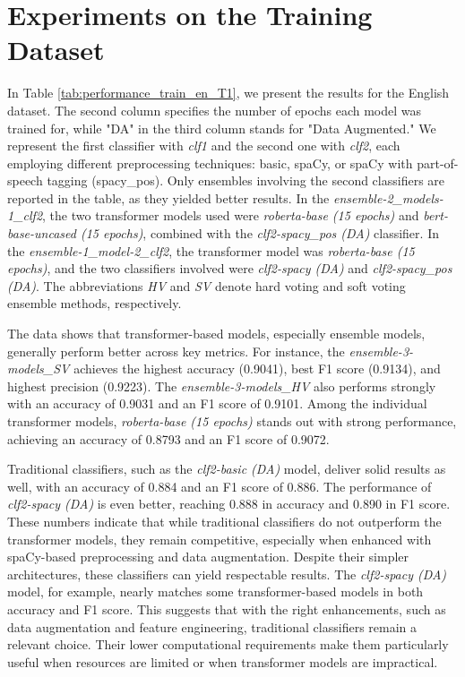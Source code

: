 \documentclass{Configuration_Files/PoliMi3i_thesis}
\begin{document}
\section{Experiments on the Training Dataset} \label{sec:experiments_train_dataset}
In Table \ref{tab:performance_train_en_T1}, we present the results for the English dataset. The second column specifies the number of epochs each model was trained for, while "DA" in the third column stands for "Data Augmented." We represent the first classifier with \textit{clf1} and the second one with \textit{clf2}, each employing different preprocessing techniques: basic, spaCy, or spaCy with part-of-speech tagging (spacy\_pos). Only ensembles involving the second classifiers are reported in the table, as they yielded better results. In the \textit{ensemble-2\_models-1\_clf2}, the two transformer models used were \textit{roberta-base (15 epochs)} and \textit{bert-base-uncased (15 epochs)}, combined with the \textit{clf2-spacy\_pos (DA)} classifier. In the \textit{ensemble-1\_model-2\_clf2}, the transformer model was \textit{roberta-base (15 epochs)}, and the two classifiers involved were \textit{clf2-spacy (DA)} and \textit{clf2-spacy\_pos (DA)}. The abbreviations \textit{HV} and \textit{SV} denote hard voting and soft voting ensemble methods, respectively.

The data shows that transformer-based models, especially ensemble models, generally perform better across key metrics. For instance, the \textit{ensemble-3-models\_SV} achieves the highest accuracy (0.9041), best F1 score (0.9134), and highest precision (0.9223). The \textit{ensemble-3-models\_HV} also performs strongly with an accuracy of 0.9031 and an F1 score of 0.9101. Among the individual transformer models, \textit{roberta-base (15 epochs)} stands out with strong performance, achieving an accuracy of 0.8793 and an F1 score of 0.9072.

Traditional classifiers, such as the \textit{clf2-basic (DA)} model, deliver solid results as well, with an accuracy of 0.884 and an F1 score of 0.886. The performance of \textit{clf2-spacy (DA)} is even better, reaching 0.888 in accuracy and 0.890 in F1 score. These numbers indicate that while traditional classifiers do not outperform the transformer models, they remain competitive, especially when enhanced with spaCy-based preprocessing and data augmentation. Despite their simpler architectures, these classifiers can yield respectable results. The \textit{clf2-spacy (DA)} model, for example, nearly matches some transformer-based models in both accuracy and F1 score. This suggests that with the right enhancements, such as data augmentation and feature engineering, traditional classifiers remain a relevant choice. Their lower computational requirements make them particularly useful when resources are limited or when transformer models are impractical.
\end{document}
